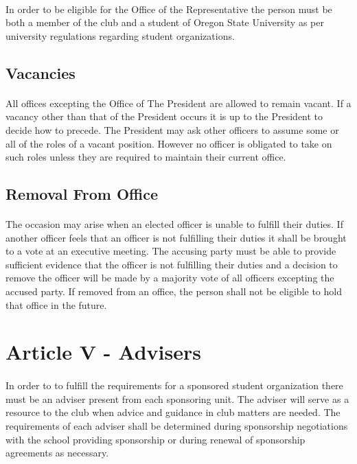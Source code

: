 \documentclass[12pt]{article}
\newcommand{\article}[1]{
\setcounter{section}{0}
\setcounter{subsection}{0}

	\section*{#1}
	\addcontentsline{toc}{section}{#1}
	
}
\begin{document}
\paragraph{}
In order to be eligible for the Office of the Representative the person must be both a member of the club and a student of Oregon State University as per university regulations regarding student organizations.

\subsection{Vacancies}
\paragraph{}
All offices excepting the Office of The President are allowed to remain vacant. If a vacancy other 
than that of the President occurs it is up to the President to decide how to precede. The President
may ask other officers to assume some or all of the roles of a vacant position. However no officer
is obligated to take on such roles unless they are required to maintain their current office. 

\subsection{Removal From Office}
\paragraph{}
The occasion may arise when an elected officer is unable to fulfill their duties. If another officer feels that an officer is not fulfilling their duties it shall be brought to a vote at an executive meeting.
The accusing party must be able to provide sufficient evidence that the officer is not fulfilling their duties and a decision to remove the officer will be made by a majority vote of all officers excepting the accused party. 
If removed from an office, the person shall not be eligible to hold that office in the future. 

\article{Article V - Advisers}
\paragraph{}
In order to to fulfill the requirements for a sponsored student organization there must be an adviser present from each sponsoring unit. 
The adviser will serve as a resource to the club when advice and guidance in club matters are needed. 
The requirements of each adviser shall be determined during sponsorship negotiations with the school
providing sponsorship or during renewal of sponsorship agreements as necessary.
\end{document}
